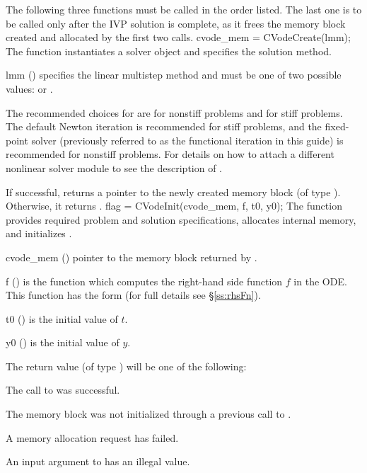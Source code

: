 The following three functions must be called in the order listed. The last one
is to be called only after the IVP solution is complete, as it frees the
{\cvodes} memory block created and allocated by the first two calls.
{
  cvode\_mem = CVodeCreate(lmm);
}
{
  The function  instantiates a {\cvodes} solver object and
  specifies the solution method.
}
{
  \begin{args}[lmm]
  \item[lmm] ()
    specifies the linear multistep method and must be one of two
    possible values:  or .
  \end{args}
  The recommended choices for  are  for nonstiff problems
  and  for stiff problems. The default Newton iteration is
  recommended for stiff problems, and the fixed-point solver (previously referred
  to as the functional iteration in this guide) is
  recommended for nonstiff problems. For details on how to attach a
  different nonlinear solver module to {\cvodes} see the description of
  .
}
{
  If successful,  returns a pointer to the newly created
  {\cvodes} memory block (of type ).  Otherwise, it returns .
}
{}
{
flag = CVodeInit(cvode\_mem, f, t0, y0);
}
{
  The function  provides required problem and solution
  specifications, allocates internal memory, and initializes {\cvodes}.
}
{
  \begin{args}
  \item[cvode\_mem] ()
    pointer to the {\cvodes} memory block returned by .
  \item[f] ()
    is the {\CC} function which computes the right-hand side function $f$ in the ODE.
    This function has the form  (for full details see
    \S\ref{ss:rhsFn}).
  \item[t0] ()
    is the initial value of $t$.
  \item[y0] ()
    is the initial value of $y$.
  \end{args}
}
{
  The return value  (of type ) will be one of the following:
  \begin{args}
  \item[\Id{CV\_SUCCESS}]
    The call to  was successful.
  \item[\Id{CV\_MEM\_NULL}]
    The {\cvodes} memory block was not initialized through a previous call
    to .
  \item[\Id{CV\_MEM\_FAIL}]
    A memory allocation request has failed.
  \item[\Id{CV\_ILL\_INPUT}]
    An input argument to  has an illegal value.
  \end{args}
}
